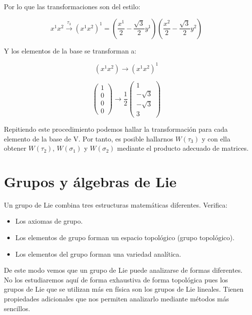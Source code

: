 \documentclass{article}
\begin{document}
\begin{enumerate}
\begin{enumerate}
Por lo que las transformaciones son del estilo:

$$x^1x^2 \overset{\tau _3}{\longrightarrow} (x^1 x^2)^1=\left ( \frac{x^1}{2}-\frac{\sqrt{3}}{2}y^1 \right) \left ( \frac{x^2}{2}-\frac{\sqrt{3}}{2}y^2 \right)$$

Y los elementos de la base se transforman a:

$$(x^1x^2) \longrightarrow (x^1x^2)^1$$

$$\left( \begin{array}{c}
 1  \\
 0 \\
 0 \\
 0
\end{array} \right )\longrightarrow \frac{1}{2} \left( \begin{array}{c}
 1  \\
 -\sqrt{3} \\
 -\sqrt{3}\\
 3
\end{array} \right )$$

Repitiendo este procedimiento podemos hallar la transformación para cada elemento de la base de V. Por tanto, es posible hallarnos $W(\tau _3)$ y con ella obtener $W(\tau _2)$, $W(\sigma _1)$ y $W(\sigma _2)$ mediante el producto adecuado de matrices.
\end{enumerate}
\end{enumerate}

\newpage

%
%
%
%
%
%
%
%
%
%
%
%
%
%
%
%

\section{ Grupos y álgebras de Lie}

Un grupo de Lie combina tres estructuras matemáticas diferentes. Verifica:

\begin{itemize}
\item Los axiomas de grupo.
\item Los elementos de grupo forman un espacio topológico (grupo topológico).
\item Los elementos del grupo forman una variedad analítica.
\end{itemize}

De este modo vemos que un grupo de Lie puede analizarse de formas diferentes. No los estudiaremos aquí de forma exhaustiva de forma topológica pues los grupos de Lie que se utilizan más en física son los grupos de Lie lineales. Tienen propiedades adicionales que nos permiten analizarlo mediante métodos más sencillos.
\end{document}
